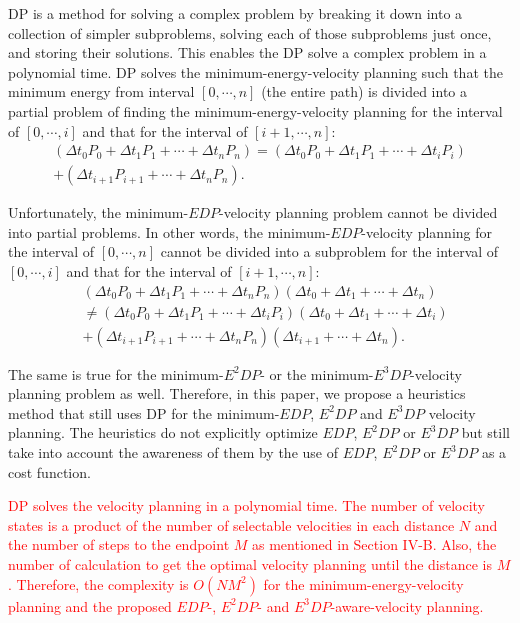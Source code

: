 \documentclass{IEEEtran}
\begin{document}
DP is a method for solving a complex problem by breaking it down into a collection of simpler subproblems, solving each of those subproblems just once, and storing their solutions. This enables the DP solve a complex problem in a polynomial time. DP solves the minimum-energy-velocity planning such that the minimum energy from interval $[0,\cdots,n]$ (the entire path) is divided into a partial problem of finding the minimum-energy-velocity planning for the interval of $[0, \cdots, i]$ and that for the interval of  $[i+1, \cdots, n]$:
%
\begin{align}
 (\Delta t_0 P_0 + \Delta t_1 P_1 + \cdots + \Delta t_n P_n)
 = (\Delta t_0 P_0 + \Delta t_1 P_1 + \cdots + \Delta t_i P_i) \nonumber \\
 + (\Delta t_{i+1} P_{i+1} + \cdots + \Delta t_n P_n).
\end{align}

Unfortunately, the minimum-$EDP$-velocity planning problem cannot be divided into partial problems. In other words, the minimum-$EDP$-velocity planning for the interval of $[0, \cdots, n]$ cannot be divided into a subproblem for the interval of $[0, \cdots,  i]$ and that for the interval of $[i+1,\cdots, n]$:
%
\begin{align}
&(\Delta t_0 P_0 + \Delta t_1 P_1 + \cdots + \Delta t_n P_n)(\Delta t_0 + \Delta t_1 + \cdots + \Delta t_n) \nonumber \\ 
&\neq (\Delta t_0 P_0 + \Delta t_1 P_1 + \cdots + \Delta t_i P_i)(\Delta t_0 + \Delta t_1 + \cdots + \Delta t_i) \nonumber \\
&+ (\Delta t_{i+1} P_{i+1} + \cdots + \Delta t_n P_n)(\Delta t_{i+1} + \cdots + \Delta t_n).
\end{align} 

The same is true for the minimum-$E^2DP$- or the minimum-$E^3DP$-velocity planning problem as well. Therefore, in this paper, we propose a heuristics method that still uses DP for the minimum-$EDP$, $E^2DP$ and $E^3DP$ velocity planning. The heuristics do not explicitly optimize $EDP$, $E^2DP$ or $E^3DP$ but still take into account the awareness of them by the use of $EDP$, $E^2DP$ or $E^3DP$ as a cost function. 

\textcolor{red}{DP solves the velocity planning in a polynomial time. The number of velocity states is a product of the number of selectable velocities in each distance $N$ and the number of steps to the endpoint $M$ as mentioned in Section IV-B. Also, the number of calculation to get the optimal velocity planning until the distance is $M$. Therefore, the complexity is $O(NM^2)$ for the minimum-energy-velocity planning and the proposed $EDP$-, $E^2DP$- and $E^3DP$-aware-velocity planning.} 
\end{document}
